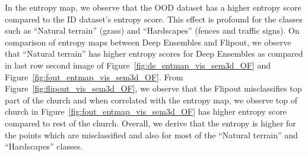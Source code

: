     In the entropy map, we observe that the OOD dataset has a higher entropy score compared to the ID dataset's entropy score.
    This effect is profound for the classes such as ``Natural terrain'' (grass) and ``Hardscapes'' (fences and traffic signs).
    On comparison of entropy maps between Deep Ensembles and Flipout, we observe that ``Natural terrain'' has higher entropy scores for Deep Ensembles as compared in last row second image of Figure~\ref{fig:de_entmap_vis_sem3d_OF} and Figure~\ref{fig:fout_entmap_vis_sem3d_OF}.
    From Figure~\ref{fig:flipout_vis_sem3d_OF}, we observe that the Flipout misclassifies top part of the church and when correlated with the entropy map, we observe top of church in Figure~\ref{fig:fout_entmap_vis_sem3d_OF} has higher entropy score compared to rest of the church.
    Overall, we derive that the entropy is higher for the points which are misclassified and also for most of the ``Natural terrain'' and ``Hardscapes'' classes.
